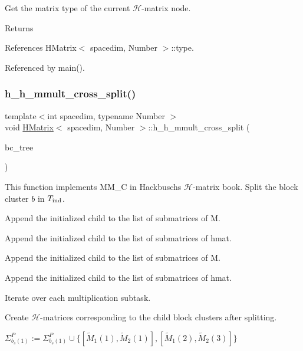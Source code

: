 Get the matrix type of the current $\mathcal{H}$-\/matrix node. \begin{DoxyReturn}{Returns}

\end{DoxyReturn}


References H\+Matrix$<$ spacedim, Number $>$\+::type.



Referenced by main().

\mbox{\label{classHMatrix_ab315324e3ece178943f406823f792746}} 
\subsubsection{\texorpdfstring{h\+\_\+h\+\_\+mmult\+\_\+cross\+\_\+split()}{h\_h\_mmult\_cross\_split()}}
{\footnotesize\ttfamily template$<$int spacedim, typename Number $>$ \\
void \hyperlink{classHMatrix}{H\+Matrix}$<$ spacedim, Number $>$\+::h\+\_\+h\+\_\+mmult\+\_\+cross\+\_\+split (\begin{DoxyParamCaption}\item[{\hyperlink{classBlockClusterTree}{Block\+Cluster\+Tree}$<$ spacedim, Number $>$ \&}]{bc\+\_\+tree }\end{DoxyParamCaption})}

This function implements {\ttfamily M\+M\+\_\+C} in Hackbusch\textquotesingle{}s $\mathcal{H}$-\/matrix book. Split the block cluster $b$ in $T_{\rm ind}$.

Append the initialized child to the list of submatrices of {\ttfamily M}.

Append the initialized child to the list of submatrices of {\ttfamily hmat}.

Append the initialized child to the list of submatrices of {\ttfamily M}.

Append the initialized child to the list of submatrices of {\ttfamily hmat}.

Iterate over each multiplication subtask.

Create $\mathcal{H}$-\/matrices corresponding to the child block clusters after splitting.

$\Sigma_{b_s(1)}^P := \Sigma_{b_s(1)}^P \cup \{[\tilde{M}_1(1), \tilde{M}_2(1)], [\tilde{M}_1(2), \tilde{M}_2(3)]\}$

